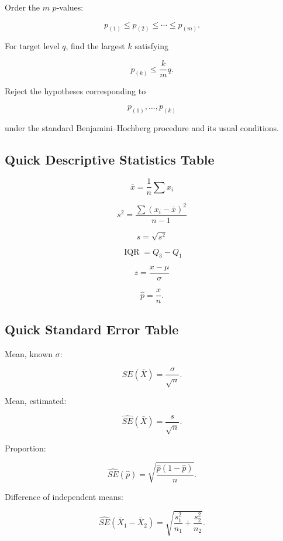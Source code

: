 Order the \(m\) \(p\)-values:

\[
p_{(1)}
\leq
p_{(2)}
\leq
\cdots
\leq
p_{(m)}.
\]

For target level \(q\), find the largest \(k\) satisfying

\[
\boxed{
p_{(k)}
\leq
\frac{k}{m}q.
}
\]

Reject the hypotheses corresponding to

\[
p_{(1)},\ldots,p_{(k)}
\]

under the standard Benjamini--Hochberg procedure and its usual conditions.

\subsection{Quick Descriptive Statistics Table}
\label{subsec:quick-descriptive-statistics-table}

\[
\boxed{
\bar{x}
=
\frac1n
\sum x_i
}
\]

\[
\boxed{
s^2
=
\frac{
\sum
(x_i-\bar{x})^2
}{
n-1
}
}
\]

\[
\boxed{
s
=
\sqrt{s^2}
}
\]

\[
\boxed{
\operatorname{IQR}
=
Q_3-Q_1
}
\]

\[
\boxed{
z
=
\frac{x-\mu}{\sigma}
}
\]

\[
\boxed{
\hat p
=
\frac{x}{n}.
}
\]

\subsection{Quick Standard Error Table}
\label{subsec:quick-standard-error-table}

Mean, known \(\sigma\):

\[
\boxed{
SE(\bar X)
=
\frac{\sigma}{\sqrt n}.
}
\]

Mean, estimated:

\[
\boxed{
\widehat{SE}(\bar X)
=
\frac{s}{\sqrt n}.
}
\]

Proportion:

\[
\boxed{
\widehat{SE}(\hat p)
=
\sqrt{
\frac{
\hat p(1-\hat p)
}{
n
}
}.
}
\]

Difference of independent means:

\[
\boxed{
\widehat{SE}
(\bar X_1-\bar X_2)
=
\sqrt{
\frac{s_1^2}{n_1}
+
\frac{s_2^2}{n_2}
}.
}
\]

